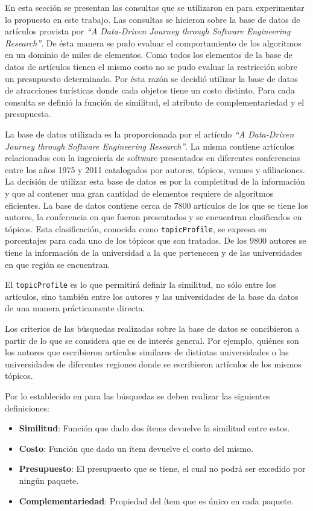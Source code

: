 En esta sección se presentan las consultas que se utilizaron en para experimentar lo propuesto en este trabajo. Las consultas se hicieron sobre la base de datos de artículos provista por \textit{\textquotedblleft A Data-Driven Journey through Software Engineering Research\textquotedblright}\cite{dataDrive}. De ésta manera se pudo evaluar el comportamiento de los algoritmos en un dominio de miles de elementos. Como todos los elementos de la base de datos de artículos tienen el mismo costo no se pudo evaluar la restricción sobre un presupuesto determinado. Por ésta razón se decidió utilizar la base de datos de atracciones turísticas donde cada objetos tiene un costo distinto. Para cada consulta se definió la función de similitud, el atributo de complementariedad y el presupuesto. 


La base de datos utilizada es la proporcionada por el artículo \textit{\textquotedblleft A Data-Driven Journey through Software Engineering Research\textquotedblright}\cite{dataDrive}. La misma contiene artículos relacionados con la ingeniería de software presentados en diferentes conferencias entre los años 1975 y 2011 catalogados por autores, tópicos, venues y afiliaciones. La decisión de utilizar esta base de datos es por la completitud de la información y que al contener una gran cantidad de elementos requiere de algoritmos eficientes. La base de datos contiene cerca de $7800$ artículos de los que se tiene los autores, la conferencia en que fueron presentados y se encuentran clasificados en tópicos. Esta clasificación, conocida como \texttt{topicProfile}, se expresa en porcentajes para cada uno de los tópicos que son tratados. De los $9800$ autores se tiene la información de la universidad a la que pertenecen y de las universidades en que región se encuentran.

El \texttt{topicProfile} es lo que permitirá definir la similitud, no sólo entre los artículos, sino también entre los autores y las universidades de la base da datos de una manera prácticamente directa.

Los criterios de las búsquedas realizadas sobre la base de datos se concibieron a partir de lo que se considera que es de interés general. Por ejemplo, quiénes son los autores que escribieron artículos similares de distintas universidades o las universidades de diferentes regiones donde se escribieron artículos de los mismos tópicos.

Por lo establecido en \cite{compositeRetrival} para las búsquedas se deben realizar las siguientes definiciones:
\begin{itemize}
  \item \textbf{Similitud}: Función que dado dos ítems devuelve la similitud entre estos.
  \item \textbf{Costo}: Función que dado un ítem devuelve el costo del mismo.
  \item \textbf{Presupuesto}: El presupuesto que se tiene, el cual no podrá ser excedido por ningún paquete.
  \item \textbf{Complementariedad}: Propiedad del ítem que es único en cada paquete.
\end{itemize}

